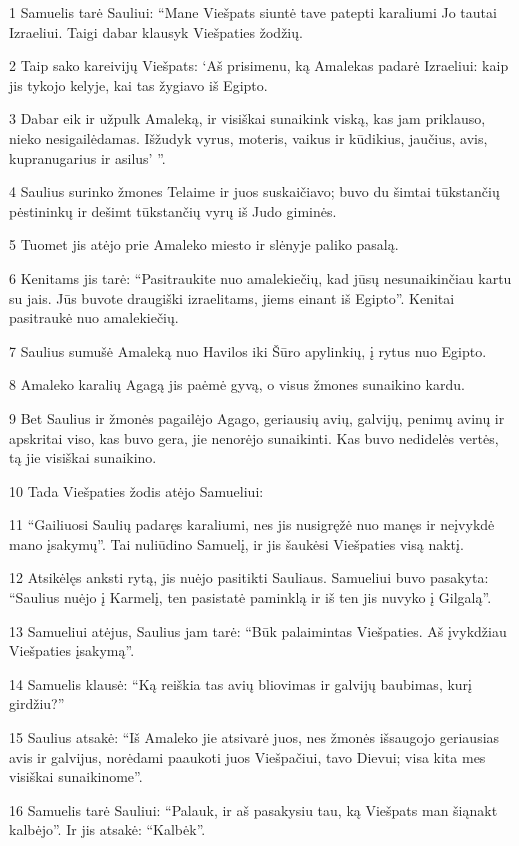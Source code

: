 \par 1 Samuelis tarė Sauliui: “Mane Viešpats siuntė tave patepti karaliumi Jo tautai Izraeliui. Taigi dabar klausyk Viešpaties žodžių. 
\par 2 Taip sako kareivijų Viešpats: ‘Aš prisimenu, ką Amalekas padarė Izraeliui: kaip jis tykojo kelyje, kai tas žygiavo iš Egipto. 
\par 3 Dabar eik ir užpulk Amaleką, ir visiškai sunaikink viską, kas jam priklauso, nieko nesigailėdamas. Išžudyk vyrus, moteris, vaikus ir kūdikius, jaučius, avis, kupranugarius ir asilus’ ”. 
\par 4 Saulius surinko žmones Telaime ir juos suskaičiavo; buvo du šimtai tūkstančių pėstininkų ir dešimt tūkstančių vyrų iš Judo giminės. 
\par 5 Tuomet jis atėjo prie Amaleko miesto ir slėnyje paliko pasalą. 
\par 6 Kenitams jis tarė: “Pasitraukite nuo amalekiečių, kad jūsų nesunaikinčiau kartu su jais. Jūs buvote draugiški izraelitams, jiems einant iš Egipto”. Kenitai pasitraukė nuo amalekiečių. 
\par 7 Saulius sumušė Amaleką nuo Havilos iki Šūro apylinkių, į rytus nuo Egipto. 
\par 8 Amaleko karalių Agagą jis paėmė gyvą, o visus žmones sunaikino kardu. 
\par 9 Bet Saulius ir žmonės pagailėjo Agago, geriausių avių, galvijų, penimų avinų ir apskritai viso, kas buvo gera, jie nenorėjo sunaikinti. Kas buvo nedidelės vertės, tą jie visiškai sunaikino. 
\par 10 Tada Viešpaties žodis atėjo Samueliui: 
\par 11 “Gailiuosi Saulių padaręs karaliumi, nes jis nusigręžė nuo manęs ir neįvykdė mano įsakymų”. Tai nuliūdino Samuelį, ir jis šaukėsi Viešpaties visą naktį. 
\par 12 Atsikėlęs anksti rytą, jis nuėjo pasitikti Sauliaus. Samueliui buvo pasakyta: “Saulius nuėjo į Karmelį, ten pasistatė paminklą ir iš ten jis nuvyko į Gilgalą”. 
\par 13 Samueliui atėjus, Saulius jam tarė: “Būk palaimintas Viešpaties. Aš įvykdžiau Viešpaties įsakymą”. 
\par 14 Samuelis klausė: “Ką reiškia tas avių bliovimas ir galvijų baubimas, kurį girdžiu?” 
\par 15 Saulius atsakė: “Iš Amaleko jie atsivarė juos, nes žmonės išsaugojo geriausias avis ir galvijus, norėdami paaukoti juos Viešpačiui, tavo Dievui; visa kita mes visiškai sunaikinome”. 
\par 16 Samuelis tarė Sauliui: “Palauk, ir aš pasakysiu tau, ką Viešpats man šiąnakt kalbėjo”. Ir jis atsakė: “Kalbėk”. 
